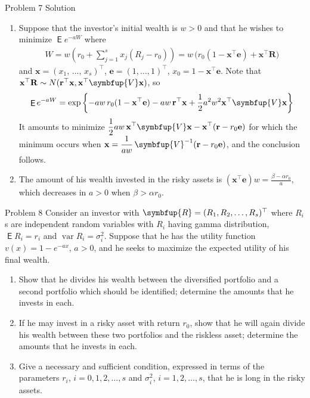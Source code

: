 \documentclass[10pt,handout]{beamer}
\newcommand{\ds}{\displaystyle}
\newcommand{\vR}{\symbfup{R}}
\newcommand{\vV}{\symbfup{V}}
\DeclareMathOperator\expc{\mathsf{E}}
\DeclareMathOperator\var{var}
\theoremstyle{definition}
\begin{document}
\begin{frame}{Problem 7 Solution}
  \begin{enumerate}
    \item Suppose that the investor's initial wealth is $w > 0$ and that he wishes to minimize $\expc{e^{-aW}}$ where
      \begin{align*}
        W = w\left(r_0 + \sum_{j=1}^s x_j(R_j - r_0)\right) = w\,\big(r_0(1-\mathbf{x}^\top\mathbf{e}) + \mathbf{x}^\top\mathbf{R}\big)
      \end{align*}
      and $\mathbf{x} = (x_1,\,\ldots,\,x_s)^\top$, $\mathbf{e} = (1,\ldots,1)^\top$, $x_0 = 1 - \mathbf{x}^\top\mathbf{e}$. Note that $\mathbf{x}^\top\mathbf{R}\sim N(\mathbf{r}^\top\mathbf{x}, \mathbf{x}^\top\vV\mathbf{x})$, so 
      \begin{align*}
        \expc{e^{-aW}} = \exp\left\{-aw\,r_0(1-\mathbf{x}^\top\mathbf{e}) - aw\,\mathbf{r}^\top\mathbf{x} + \frac{1}{2}a^2w^2\mathbf{x}^\top\vV\mathbf{x}\right\}
      \end{align*}
      It amounts to minimize $\ds\frac{1}{2}aw\,\mathbf{x}^\top\vV\mathbf{x} - \mathbf{x}^\top(\mathbf{r} - r_0\mathbf{e})$ for which the minimum occurs when $\ds\mathbf{x} = \frac{1}{aw}\,\vV^{-1}(\mathbf{r} - r_0\mathbf{e})$, and the conclusion follows. 
    \item The amount of his wealth invested in the risky assets is $\ds(\mathbf{x}^\top\mathbf{e})w = \frac{\beta - \alpha r_0}{a}$, which decreases in $a > 0$ when $\beta > \alpha r_0$.
  \end{enumerate}
\end{frame}

\begin{frame}{Problem 8}
  Consider an investor with $\vR = (R_1, R_2, \ldots, R_s)^\top$ where $R_i$s are independent random variables with $R_i$ having gamma distribution, $\expc{R_i} = r_i$ and $\var R_i = \sigma_i^2$. Suppose that he has the utility function $v(x) = 1 - e^{-ax}$, $a > 0$, and he seeks to maximize the expected utility of his final wealth. 
  \begin{enumerate}
    \item Show that he divides his wealth between the diversified portfolio and a second portfolio which should be identified; determine the amounts that he invests in each. 
    \item If he may invest in a risky asset with return $r_0$, show that he will again divide his wealth between these two portfolios and the riskless asset; determine the amounts that he invests in each. 
    \item Give a necessary and sufficient condition, expressed in terms of the parameters $r_i$, $i = 0, 1, 2, \ldots, s$ and $\sigma_i^2$, $i = 1, 2, \ldots, s$, that he is long in the risky assets.
  \end{enumerate}
\end{frame}
\end{document}
